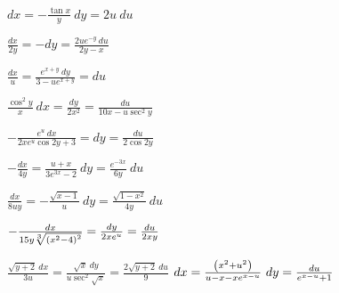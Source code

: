 \begin{multicols}{2}
\begin{enumtasks}
			\label{nonlinsys_systodes:symmetrical2hard}
			\item \( dx = - \frac{\tan{x}}{y} ~ dy = 2u ~ du \) 																	%
			\item \( \frac{dx}{2y} = - dy = \frac{2u e^{-y} ~ du}{2y - x} \) 														%
			\item \( \frac{dx}{u} = \frac{e^{x+y} ~ dy}{3 - ue^{x+y}} = du \) 														%
			\item \( \frac{\cos^2{y}}{x} ~ dx = \frac{dy}{2 x^2} = \frac{du}{10x - u \sec^2{y}} \) 									%
			\item \( - \frac{e^u ~ dx}{2 x e^u \cos{2y} + 3} = dy = \frac{du}{2 \cos{2y}} \) 										%
			\item \( - \frac{dx}{4 y} = \frac{u + x}{3 e^{3x} - 2} ~ dy = \frac{e^{- 3 x}}{6 y} ~ du \) 							%
			\item \( \frac{dx}{8 u y} = - \frac{\sqrt{x - 1}}{u} ~ dy = \frac{\sqrt{1 - x^2}}{4 y} ~ du \) 							%
			\item \( - \frac{dx}{15 y \sqrt[3]{\left( x^2 - 4 \right)^2}} = \frac{dy}{2x e^{u}} = \frac{du}{2 x y} \) 						%
			\item \( \frac{\sqrt{y + 2} ~ dx}{3 u} = \frac{\sqrt{x} ~ dy}{u \sec^2{\sqrt{x}}} = \frac{2 \sqrt{y + 2} ~ du}{9} \) 	%
			\itemstar \( dx = \frac{\left( x^2 + u^2 \right)}{u - x - xe^{x - u}} ~ dy = \frac{du}{e^{x - u} + 1} \) 							%

		\end{enumtasks}
	\end{multicols}

	\vspace{10pt}

